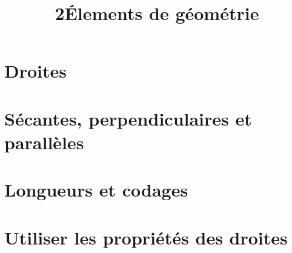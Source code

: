 \documentclass[12pt,a4paper]{article}
\date{}
\title{\textcircled{{\normalsize{2}}}\'Elements de géométrie}
\begin{document}
%
%


\maketitle



\section{Droites}



\newpage


\section{Sécantes, perpendiculaires et parallèles}





\newpage
\section{Longueurs et codages}
%



\newpage

\section{Utiliser les propriétés des droites}


\end{document}

